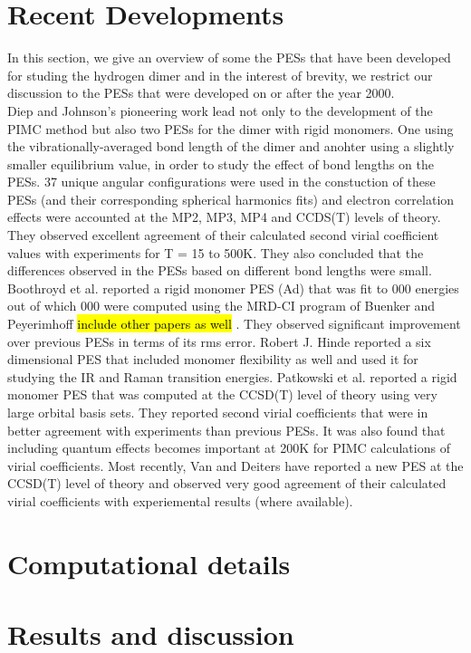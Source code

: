     \section{Recent Developments}
        In this section, we give an overview of some the \abInitio PESs that have been developed for studing the hydrogen dimer and in the interest of brevity, we restrict our discussion to the PESs that were developed on or after the year 2000.\\
 
        Diep and Johnson's \cite{Diep2000} pioneering work lead not only to the development of the PIMC method but also two \abInitio PESs for the dimer with rigid monomers. One using the vibrationally-averaged bond length of the dimer and anohter using a slightly smaller equilibrium value, in order to study the effect of bond lengths on the PESs. 37 unique angular configurations were used in the constuction of these PESs (and their corresponding spherical harmonics fits) and electron correlation effects were accounted at the MP2, MP3, MP4 and CCDS(T) levels of theory. They observed excellent agreement of their calculated second virial coefficient values with experiments for T = 15 to 500K. They also concluded that the differences observed in the PESs based on different bond lengths were small. Boothroyd et al. \cite{Boothroyd2002} reported a rigid monomer PES (Ad) that was fit to  000 \abInitio energies out of which  000 were computed using the MRD-CI program of Buenker and Peyerimhoff \hl{include other papers as well} \cite{Buenker1974}. They observed significant improvement over previous PESs in terms of its rms error. Robert J. Hinde \cite{Hinde2008} reported a six dimensional PES that included monomer flexibility as well and used it for studying the IR and Raman transition energies. Patkowski et al. \cite{Patkowski2008} reported a rigid monomer PES that was computed at the CCSD(T) level of theory using very large orbital basis sets. They reported second virial coefficients that were in better agreement with experiments than previous PESs. It was also found that including quantum effects becomes important at \Sim 200K for PIMC calculations of virial coefficients. Most recently, Van and Deiters \cite{Tat2015} have reported a new \abInitio PES at the CCSD(T) level of theory and observed very good agreement of their calculated virial coefficients with experiemental results (where available). 
    \section{Computational details}
    \section{Results and discussion}
